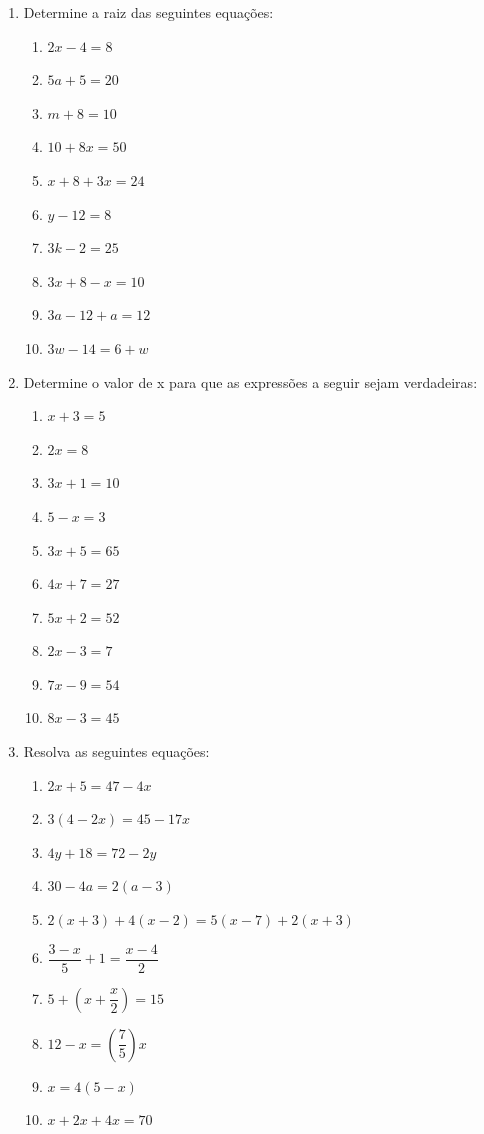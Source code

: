 \documentclass[a4paper,12pt]{article}
\begin{document}
		\begin{enumerate}
			\item Determine a raiz das seguintes equações:
			\begin{enumerate}[label=(\alph*), itemsep=1em]
				\item $2x-4=8$
				\item $5a+5=20$
				\item $m+8=10$
				\item $10+8x=50$
				\item $x+8+3x=24$
				\item $y-12=8$
				\item $3k-2=25$
				\item $3x+8-x=10$
				\item $3a-12+a=12$
				\item $3w-14=6+w$ \\
			\end{enumerate}

			\item Determine o valor de x para que as expressões a seguir sejam verdadeiras:
			
			\begin{enumerate}[label=(\alph*), itemsep=1em]
				\item $x+3=5$
				\item $2x=8$
				\item $3x+1=10$
				\item $5-x=3$
				\item $3x+5=65$
				\item $4x+7=27$
				\item $5x+2=52$
				\item $2x-3=7$
				\item $7x-9=54$
				\item $8x-3=45$
			\end{enumerate}

			\item Resolva as seguintes equações:
			
			\begin{enumerate}[label=(\alph*), itemsep=1em]
				\item $2x+5=47-4x$
				\item $3(4-2x)=45-17x$
				\item $4y+18=72-2y$
				\item $30-4a=2(a-3)$
				\item $2(x+3)+4(x-2)=5(x-7)+2(x+3)$
				\item $\dfrac{3-x}{5}+1=\dfrac{x-4}{2}$
				\item $5+\left( x+\dfrac{x}{2} \right)=15$
				\item $12-x=\left( \dfrac{7}{5} \right) x$
				\item $x=4(5-x)$
				\item $x+2x+4x=70$
			\end{enumerate}


\end{enumerate}
\end{document}
